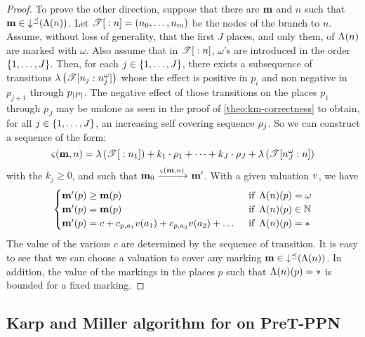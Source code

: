 \begin{proof}
  To prove the other direction, suppose that there are $\mar$ and $n$ such that $\mar \in \downc{\lab{n}}$.
  Let $\treepath{n} = \bodySeq[n]{0}{m}$ be the nodes of the branch to $n$.
  Assume, without loss of generality, that the first $J$ places, and only them, of $\lab{n}$ are marked with $\omega$.
  Also assume that in $\treepath{n}$, $\omega$'s are introduced in the order $\range{1}{J}$.
  Then, for each $j \in \range{1}{J}$, there exists a subsequence of transitions
  $\labt{\treepath[n_j]{n^\omega_j}}$
  whose the effect is positive in $p_i$ and non negative in $p_{j+1}$ through $p_{\card{\places}}$.
  The negative effect of those transitions on the places $p_1$ through $p_J$ may be undone as seen in the proof of \cref{theo:km-correctness} to obtain, for all $j \in \range{1}{J}$, an increasing self covering sequence $\seqt[2]_j$.
  So we can construct a sequence of the form:
  \[ \tts{\mar}{n} = \labt{\treepath{n_1}} + k_1 \cdot \iscs{1} + \dots + k_J \cdot \iscs{J} + \labt{\treepath[n^\omega_J]{n}} \]
  with the \( k_j \geq 0 \),
  and
  such that \( \mari \fire{\tts{\mar}{n}} \mar'\). %
  With a given valuation $\val$, we have
  \[
    \begin{cases}
      \mar'(p) \geq \mar(p) &\tif \lab{n}(p) =   \omega \\
      \mar'(p) =    \mar(p) &\tif \lab{n}(p) \in \naturals \\
      \mar'(p) =    c + c_{p, \param_1} \val[\param_1] + c_{p, \param_2} \val[\param_2] + \dots
                            &\tif \lab{n}(p) =   *
    \end{cases}
  \]
  The value of the various $c$ are determined by the sequence of transition.
  It is easy to see that we can choose a valuation to cover any marking $\mar \in \downc{\lab{n}}$.
  In addition, the value of the markings in the places $p$ such that $\lab{n}(p) = *$ is bounded for a fixed marking.
\end{proof}


\subsection{Karp and Miller algorithm for \Ucov on PreT-\ac{PPN}}
\label{sec:km-ucov-pret-ppn}

